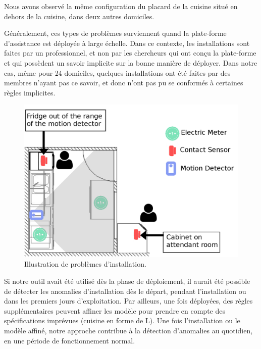 Nous avons observé la même configuration du placard de la cuisine situé en 
dehors de la cuisine, dans deux autres domiciles.

Généralement, ces types de problèmes surviennent quand la plate-forme d'assistance est 
déployée à large échelle. Dans ce contexte, les installations sont faites par 
un professionnel, et non par les chercheurs qui ont conçu la
plate-forme et qui possèdent un savoir implicite sur la bonne manière de déployer. Dans notre cas, 
même pour 24 domiciles, quelques installations ont été faites par des membres 
n'ayant pas ce savoir, et donc n'ont pas pu se conformés à certaines règles implicites.

\begin{figure}[!h]
  \centering
      \includegraphics[width=\linewidth,totalheight=\textheight,keepaspectratio]{gfx/nconf2.png}
      \caption{Illustration de problèmes d'installation.}
      \label{fig:map}
\end{figure}

Si notre outil avait été utilisé dès la phase de déploiement, il aurait été 
possible de détecter les anomalies d'installation dès le départ, pendant 
l'installation ou dans les premiers jours d'exploitation. Par ailleurs, une 
fois déployées, des règles supplémentaires peuvent affiner les modèle pour 
prendre en compte des spécifications imprévues (\eg cuisine en forme de L). 
Une fois l'installation ou le modèle affiné, notre approche contribue à la détection 
d'anomalies au quotidien, en une période de fonctionnement normal.

